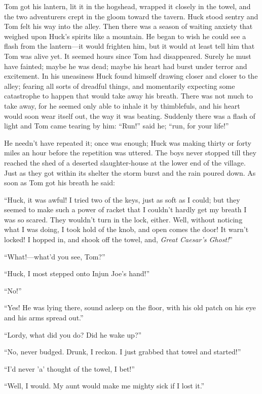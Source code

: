 \documentclass{book}
\begin{document}
Tom got his lantern, lit it in the hogshead, wrapped it closely in the towel, and the two adventurers crept in the gloom toward the tavern. Huck stood sentry and Tom felt his way into the alley. Then there was a season of waiting anxiety that weighed upon Huck’s spirits like a mountain. He began to wish he could see a flash from the lantern—it would frighten him, but it would at least tell him that Tom was alive yet. It seemed hours since Tom had disappeared. Surely he must have fainted; maybe he was dead; maybe his heart had burst under terror and excitement. In his uneasiness Huck found himself drawing closer and closer to the alley; fearing all sorts of dreadful things, and momentarily expecting some catastrophe to happen that would take away his breath. There was not much to take away, for he seemed only able to inhale it by thimblefuls, and his heart would soon wear itself out, the way it was beating. Suddenly there was a flash of light and Tom came tearing by him: “Run!” said he; “run, for your life!”

He needn’t have repeated it; once was enough; Huck was making thirty or forty miles an hour before the repetition was uttered. The boys never stopped till they reached the shed of a deserted slaughter-house at the lower end of the village. Just as they got within its shelter the storm burst and the rain poured down. As soon as Tom got his breath he said:

“Huck, it was awful! I tried two of the keys, just as soft as I could; but they seemed to make such a power of racket that I couldn’t hardly get my breath I was so scared. They wouldn’t turn in the lock, either. Well, without noticing what I was doing, I took hold of the knob, and open comes the door! It warn’t locked! I hopped in, and shook off the towel, and, \emph{Great Caesar’s Ghost!}”

“What!—what’d you see, Tom?”

“Huck, I most stepped onto Injun Joe’s hand!”

“No!”

“Yes! He was lying there, sound asleep on the floor, with his old patch on his eye and his arms spread out.”

“Lordy, what did you do? Did he wake up?”

“No, never budged. Drunk, I reckon. I just grabbed that towel and started!”

“I’d never ’a’ thought of the towel, I bet!”

“Well, I would. My aunt would make me mighty sick if I lost it.”
\end{document}
